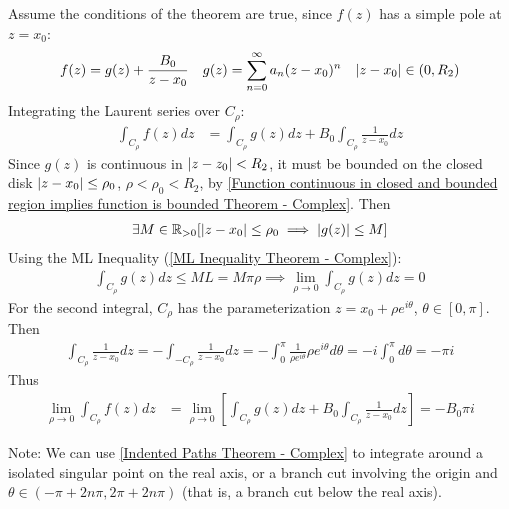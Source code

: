 \documentclass[12pt, english]{book}
\makeatletter
\renewenvironment{proof}[1][\proofname]{\par
	\pushQED{\qed}%
	\normalfont \topsep6\p@\@plus6\p@\relax
	\list{}{%
		\settowidth{\leftmargin}{\itshape\proofname:\hskip\labelsep}%
		\setlength{\labelwidth}{0pt}%
		\setlength{\itemindent}{-\leftmargin}%
	}%
	\item[\hskip\labelsep\itshape#1\@addpunct{:}]\ignorespaces
}{%
	\popQED\endlist\@endpefalse
}
\makeatother
\begin{document}
	\begin{proof}
		Assume the conditions of the theorem are true, since \(f(z)\) has a simple pole at \(z = x_0\):
		\begin{align*}
			f(z) &= g(z) + \frac{B_0}{z-x_0} & g(z) &= \sum_{n=0}^{\infty} a_n (z-x_0)^n
				& \abs{z-x_0} \in (0, R_2)
		\end{align*}
		Integrating the Laurent series over \(C_\rho\):
		\begin{align*}
			\int_{C_\rho} f(z) dz
			&= \int_{C_\rho} g(z) dz +  B_0 \int_{C_\rho} \frac{1}{z-x_0} dz 
		\end{align*}
		Since \(g(z)\) is continuous in \(\abs{z-z_0} < R_2\), it must be bounded on the closed disk \(\abs{z-x_0} \leq \rho_0\), \(\rho < \rho_0 < R_2\), by \cref{Function continuous in closed and bounded region implies function is bounded Theorem - Complex}. Then
		\begin{align*}
			\exists M \in \mathbb{R}_{>0} [\abs{z-x_0} \leq \rho_0 \implies \abs{g(z)} \leq M]
		\end{align*}
		Using the ML Inequality (\cref{ML Inequality Theorem - Complex}):
		\begin{align*}
			\int_{C_\rho} g(z) dz \leq ML = M\pi \rho
			\implies \lim_{\rho \rightarrow 0} \int_{C_\rho} g(z) dz = 0
		\end{align*}
		For the second integral, \(C_\rho\) has the parameterization \(z = x_0 + \rho e^{i\theta}\), \(\theta \in [0, \pi]\). Then
		\begin{align*}
			\int_{C_\rho} \frac{1}{z-x_0} dz 
			= - \int_{-C_\rho} \frac{1}{z-x_0} dz 
			= - \int_{0}^{\pi} \frac{1}{\rho e^{i\theta}} \rho e^{i\theta} d\theta 
			= -i \int_{0}^{\pi} d\theta = -\pi i
		\end{align*}
		Thus
		\begin{align*}
			\lim_{\rho \rightarrow 0} \int_{C_\rho} f(z) dz
			&= \lim_{\rho \rightarrow 0} \left[ \int_{C_\rho} g(z) dz + B_0 \int_{C_\rho} \frac{1}{z-x_0} dz \right] 
			 = - B_0 \pi i
		\end{align*}
	\end{proof}

	Note: We can use \cref{Indented Paths Theorem - Complex} to integrate around a isolated singular point on the real axis, or a branch cut involving the origin and \(\theta \in (-\pi + 2n\pi, 2\pi + 2n\pi)\) (that is, a branch cut below the real axis).
\end{document}
